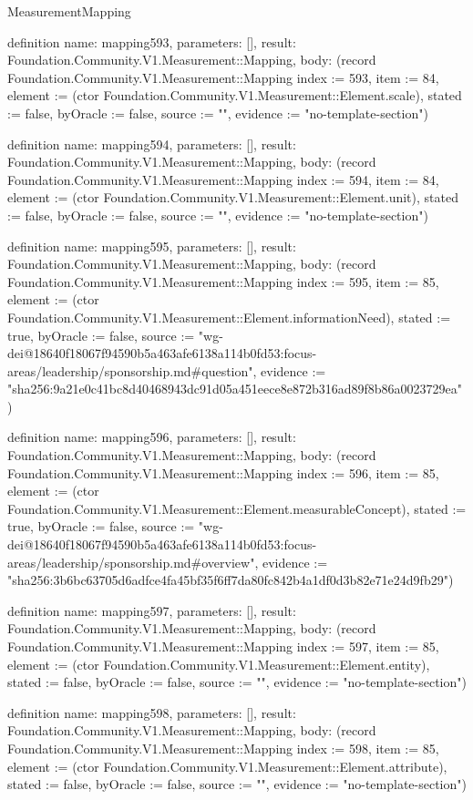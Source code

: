 \begin{lexlean}{MeasurementMapping}
\begin{semanticmodule}
definition{
  name: mapping593,
  parameters: [],
  result: Foundation.Community.V1.Measurement::Mapping,
  body: (record Foundation.Community.V1.Measurement::Mapping {index := 593, item := 84, element := (ctor Foundation.Community.V1.Measurement::Element.scale), stated := false, byOracle := false, source := "", evidence := "no-template-section"})
}

definition{
  name: mapping594,
  parameters: [],
  result: Foundation.Community.V1.Measurement::Mapping,
  body: (record Foundation.Community.V1.Measurement::Mapping {index := 594, item := 84, element := (ctor Foundation.Community.V1.Measurement::Element.unit), stated := false, byOracle := false, source := "", evidence := "no-template-section"})
}

definition{
  name: mapping595,
  parameters: [],
  result: Foundation.Community.V1.Measurement::Mapping,
  body: (record Foundation.Community.V1.Measurement::Mapping {index := 595, item := 85, element := (ctor Foundation.Community.V1.Measurement::Element.informationNeed), stated := true, byOracle := false, source := "wg-dei@18640f18067f94590b5a463afe6138a114b0fd53:focus-areas/leadership/sponsorship.md#question", evidence := "sha256:9a21e0c41bc8d40468943dc91d05a451eece8e872b316ad89f8b86a0023729ea"})
}

definition{
  name: mapping596,
  parameters: [],
  result: Foundation.Community.V1.Measurement::Mapping,
  body: (record Foundation.Community.V1.Measurement::Mapping {index := 596, item := 85, element := (ctor Foundation.Community.V1.Measurement::Element.measurableConcept), stated := true, byOracle := false, source := "wg-dei@18640f18067f94590b5a463afe6138a114b0fd53:focus-areas/leadership/sponsorship.md#overview", evidence := "sha256:3b6bc63705d6adfce4fa45bf35f6ff7da80fc842b4a1df0d3b82e71e24d9fb29"})
}

definition{
  name: mapping597,
  parameters: [],
  result: Foundation.Community.V1.Measurement::Mapping,
  body: (record Foundation.Community.V1.Measurement::Mapping {index := 597, item := 85, element := (ctor Foundation.Community.V1.Measurement::Element.entity), stated := false, byOracle := false, source := "", evidence := "no-template-section"})
}

definition{
  name: mapping598,
  parameters: [],
  result: Foundation.Community.V1.Measurement::Mapping,
  body: (record Foundation.Community.V1.Measurement::Mapping {index := 598, item := 85, element := (ctor Foundation.Community.V1.Measurement::Element.attribute), stated := false, byOracle := false, source := "", evidence := "no-template-section"})
}


\end{semanticmodule}
\end{lexlean}
